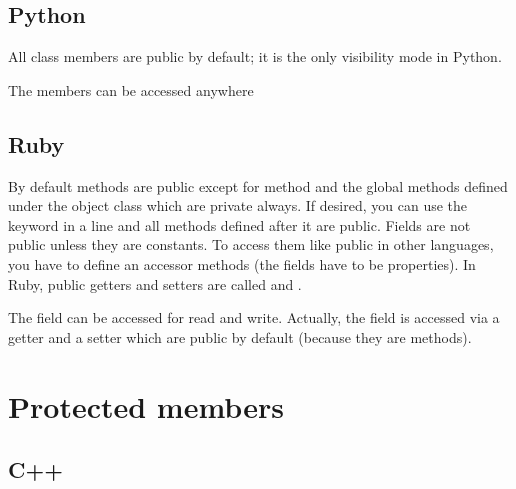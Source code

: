 \documentclass{KodeBook}
\begin{document}


\subsection{Python}

All class members are public by default; it is the only visibility mode in Python. 



The members can be accessed anywhere


\subsection{Ruby}

By default methods are public except for  method and the global methods defined under the object class which are private always. 
If desired, you can use the keyword  in a line and all methods defined after it are public. 
Fields are not public unless they are constants. 
To access them like public in other languages, you have to define an accessor methods (the fields have to be properties).
In Ruby, public getters and setters are called  and .



The field can be accessed for read and write. 
Actually, the field is accessed via a getter and a setter which are public by default (because they are methods).




\section{Protected members}

\subsection{C++}
\end{document}
